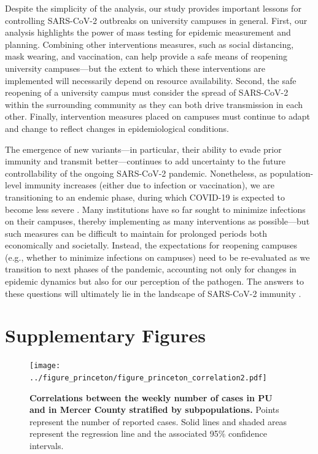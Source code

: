 \documentclass[12pt]{article}
\begin{document}
Despite the simplicity of the analysis, our study provides important lessons for controlling SARS-CoV-2 outbreaks on university campuses in general.
First, our analysis highlights the power of mass testing for epidemic measurement and planning.
Combining other interventions measures, such as social distancing, mask wearing, and vaccination, can help provide a safe means of reopening university campuses---but the extent to which these interventions are implemented will necessarily depend on resource availability.
Second, the safe reopening of a university campus must consider the spread of SARS-CoV-2 within the surrounding community as they can both drive transmission in each other.
Finally, intervention measures placed on campuses must continue to adapt and change to reflect changes in epidemiological conditions.

The emergence of new variants---in particular, their ability to evade prior immunity and transmit better---continues to add uncertainty to the future controllability of the ongoing SARS-CoV-2 pandemic.
Nonetheless, as population-level immunity increases (either due to infection or vaccination), we are transitioning to an endemic phase, during which COVID-19 is expected to become less severe \citep{lavine2021immunological}.
Many institutions have so far sought to minimize infections on their campuses, thereby implementing as many interventions as possible---but such measures can be difficult to maintain for prolonged periods both economically and societally.
Instead, the expectations for reopening campuses (e.g., whether to minimize infections on campuses) need to be re-evaluated as we transition to next phases of the pandemic, accounting not only for changes in epidemic dynamics but also for our perception of the pathogen.
The answers to these questions will ultimately lie in the landscape of SARS-CoV-2 immunity \citep{saad2020immune,baker2021limits}.



\pagebreak

\section*{Supplementary Figures}

\renewcommand{\thefigure}{S\arabic{figure}}
\setcounter{figure}{0}

\begin{figure}[!htp]
\texttt{[image: ../figure\_princeton/figure\_princeton\_correlation2.pdf]}
\caption{
\textbf{Correlations between the weekly number of cases in PU and in Mercer County stratified by subpopulations.}
Points represent the number of reported cases.
Solid lines and shaded areas represent the regression line and the associated 95\% confidence intervals.
}
\end{figure}
\end{document}
